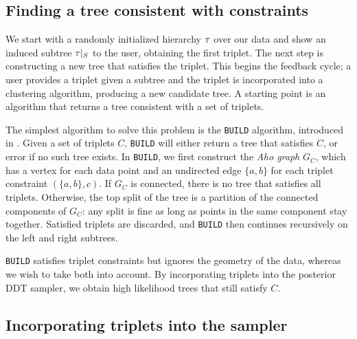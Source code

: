 
\subsection{Finding a tree consistent with constraints}
\label{sec:aho}
We start with a randomly initialized hierarchy $\tau$
over our data
and show an induced subtree $\tau|_S$ to the user, obtaining the
first triplet. The next step is constructing  
a new tree that satisfies the triplet.
This begins the feedback cycle; a user provides a triplet
given a subtree and the triplet is incorporated into a clustering algorithm,
producing a new candidate tree.
A starting point is 
an algorithm that returns 
a tree consistent with a set of triplets.

The simplest algorithm to solve this problem is
the \texttt{BUILD} algorithm, introduced in \citet{Aho1981}.
Given a set of triplets $C$, \texttt{BUILD}
will either return a tree that satisfies $C$, or error 
if no such tree exists.
In \texttt{BUILD}, we first construct the {\it Aho graph}
$G_C$, which has a vertex for each data point and an 
undirected edge $\{a,b\}$ for each triplet constraint $(\{a,b\},c)$.
If $G_C$ is connected, there is no tree that satisfies all
triplets. Otherwise, the top split of the tree is a partition of 
the connected components of $G_C$: any split is fine as long as 
points in the same component stay together. Satisfied triplets are discarded, and \texttt{BUILD} then continues recursively on the
left and right subtrees.

\texttt{BUILD} satisfies triplet constraints but ignores 
the geometry of the data, whereas we wish to take both into
account. By incorporating triplets into the posterior DDT 
sampler, we obtain high likelihood trees that still satisfy $C$.


\subsection{Incorporating triplets into the sampler}

